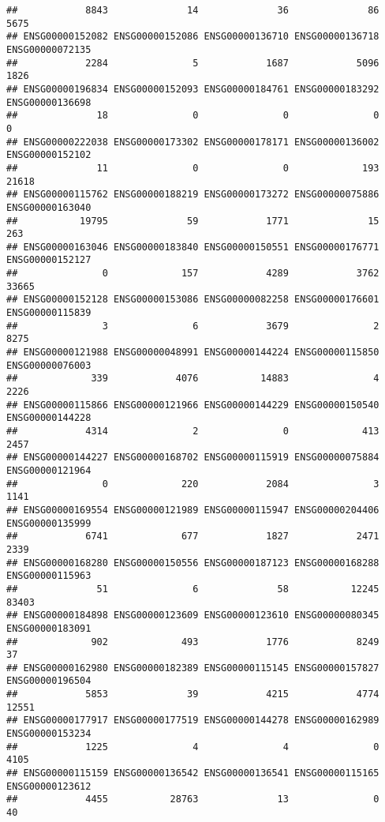 \documentclass[
]{article}
\begin{document}
\begin{verbatim}
##            8843              14              36              86            5675 
## ENSG00000152082 ENSG00000152086 ENSG00000136710 ENSG00000136718 ENSG00000072135 
##            2284               5            1687            5096            1826 
## ENSG00000196834 ENSG00000152093 ENSG00000184761 ENSG00000183292 ENSG00000136698 
##              18               0               0               0               0 
## ENSG00000222038 ENSG00000173302 ENSG00000178171 ENSG00000136002 ENSG00000152102 
##              11               0               0             193           21618 
## ENSG00000115762 ENSG00000188219 ENSG00000173272 ENSG00000075886 ENSG00000163040 
##           19795              59            1771              15             263 
## ENSG00000163046 ENSG00000183840 ENSG00000150551 ENSG00000176771 ENSG00000152127 
##               0             157            4289            3762           33665 
## ENSG00000152128 ENSG00000153086 ENSG00000082258 ENSG00000176601 ENSG00000115839 
##               3               6            3679               2            8275 
## ENSG00000121988 ENSG00000048991 ENSG00000144224 ENSG00000115850 ENSG00000076003 
##             339            4076           14883               4            2226 
## ENSG00000115866 ENSG00000121966 ENSG00000144229 ENSG00000150540 ENSG00000144228 
##            4314               2               0             413            2457 
## ENSG00000144227 ENSG00000168702 ENSG00000115919 ENSG00000075884 ENSG00000121964 
##               0             220            2084               3            1141 
## ENSG00000169554 ENSG00000121989 ENSG00000115947 ENSG00000204406 ENSG00000135999 
##            6741             677            1827            2471            2339 
## ENSG00000168280 ENSG00000150556 ENSG00000187123 ENSG00000168288 ENSG00000115963 
##              51               6              58           12245           83403 
## ENSG00000184898 ENSG00000123609 ENSG00000123610 ENSG00000080345 ENSG00000183091 
##             902             493            1776            8249              37 
## ENSG00000162980 ENSG00000182389 ENSG00000115145 ENSG00000157827 ENSG00000196504 
##            5853              39            4215            4774           12551 
## ENSG00000177917 ENSG00000177519 ENSG00000144278 ENSG00000162989 ENSG00000153234 
##            1225               4               4               0            4105 
## ENSG00000115159 ENSG00000136542 ENSG00000136541 ENSG00000115165 ENSG00000123612 
##            4455           28763              13               0              40 

\end{verbatim}
\end{document}
